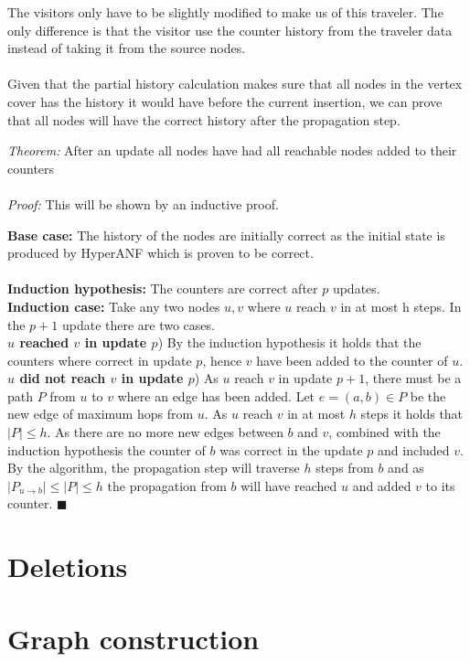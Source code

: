 The visitors only have to be slightly modified to make us of this traveler. The only difference is that the visitor use the counter history from the traveler data instead of taking it from the source nodes.\\\\

Given that the partial history calculation makes sure that all nodes in the vertex cover has the history it would have before the current insertion, we can prove that all nodes will have the correct history after the propagation step. 

\textit{Theorem: } After an update all nodes have had all reachable nodes added to their counters \\\\
\textit{Proof: } This will be shown by an inductive proof. 

\begin{addmargin}[2em]{0em}
\textbf{Base case: } The history of the nodes are initially correct as the initial state is produced by HyperANF which is proven to be correct. \\\\
\textbf{Induction hypothesis: } The counters are correct after $p$ updates.\\
\textbf{Induction case: } Take any two nodes $u,v$ where $u$ reach $v$ in at most h steps. In the $p+1$ update there are two cases. \\

\textbf{$u$ reached $v$ in update $p$}) By the induction hypothesis it holds that the counters where correct in update $p$, hence $v$ have been added to the counter of $u$.\\

\textbf{$u$ did not reach $v$ in update $p$}) As $u$ reach $v$ in update $p+1$, there must be a path $P$ from $u$ to $v$ where an edge has been added. Let $e = (a,b) \in P$ be the new edge of maximum hops from $u$. As $u$ reach $v$ in at most $h$ steps it holds that $|P| \leq h$.
 As there are no more new edges between $b$ and $v$, combined with the induction hypothesis the counter of $b$ was correct in the update $p$ and included $v$. By the algorithm, the propagation step will traverse $h$ steps from $b$ and as 
$|P_{u \rightarrow b}| \leq |P| \leq h$ the propagation from $b$ will have reached $u$ and added $v$ to its counter. $\blacksquare$


\end{addmargin}

\section{Deletions}

\section{Graph construction}

